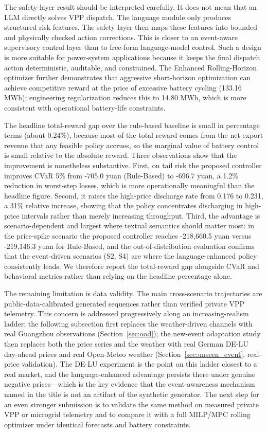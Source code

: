 \documentclass{ieeeaccess}
\begin{document}
The safety-layer result should be interpreted carefully. It does not mean that an LLM directly solves VPP dispatch. The language module only produces structured risk features. The safety layer then maps these features into bounded and physically checked action corrections. This is closer to an event-aware supervisory control layer than to free-form language-model control. Such a design is more suitable for power-system applications because it keeps the final dispatch action deterministic, auditable, and constrained. The Enhanced Rolling-Horizon optimizer further demonstrates that aggressive short-horizon optimization can achieve competitive reward at the price of excessive battery cycling (133.16 MWh); engineering regularization reduces this to 14.80 MWh, which is more consistent with operational battery-life constraints.

The headline total-reward gap over the rule-based baseline is small in percentage terms (about 0.24\%), because most of the total reward comes from the net-export revenue that any feasible policy accrues, so the marginal value of battery control is small relative to the absolute reward. Three observations show that the improvement is nonetheless substantive. First, on tail risk the proposed controller improves CVaR 5\% from -705.0 yuan (Rule-Based) to -696.7 yuan, a 1.2\% reduction in worst-step losses, which is more operationally meaningful than the headline figure. Second, it raises the high-price discharge rate from 0.176 to 0.231, a 31\% relative increase, showing that the policy concentrates discharging in high-price intervals rather than merely increasing throughput. Third, the advantage is scenario-dependent and largest where textual semantics should matter most: in the price-spike scenario the proposed controller reaches -218,660.5 yuan versus -219,146.3 yuan for Rule-Based, and the out-of-distribution evaluation confirms that the event-driven scenarios (S2, S4) are where the language-enhanced policy consistently leads. We therefore report the total-reward gap alongside CVaR and behavioral metrics rather than relying on the headline percentage alone.

The remaining limitation is data validity. The main cross-scenario trajectories are public-data-calibrated generated sequences rather than verified private VPP telemetry. This concern is addressed progressively along an increasing-realism ladder: the following subsection first replaces the weather-driven channels with real Guangzhou observations (Section~\ref{sec:ood}); the new-event adaptation study then replaces both the price series and the weather with real German DE-LU day-ahead prices and real Open-Meteo weather (Section~\ref{sec:unseen_event}, real-price validation). The DE-LU experiment is the point on this ladder closest to a real market, and the language-enhanced advantage persists there under genuine negative prices---which is the key evidence that the event-awareness mechanism named in the title is not an artifact of the synthetic generator. The next step for an even stronger submission is to validate the same method on measured private VPP or microgrid telemetry and to compare it with a full MILP/MPC rolling optimizer under identical forecasts and battery constraints.
\end{document}
